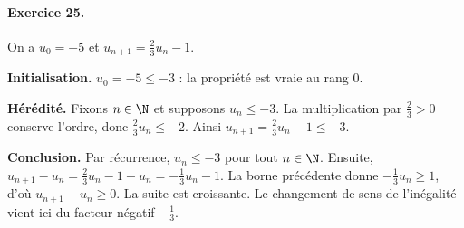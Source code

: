 \paragraph{Exercice 25.} On a $u_0=-5$ et $u_{n+1}=\frac23u_n-1$.
\par\smallskip\textbf{Initialisation.} $u_0=-5\le-3$ : la propriété est vraie au rang $0$.
\par\smallskip\textbf{Hérédité.} Fixons $n\in\N$ et supposons $u_n\le-3$. La multiplication par $\frac23>0$ conserve l'ordre, donc $\frac23u_n\le-2$. Ainsi $u_{n+1}=\frac23u_n-1\le-3$.
\par\smallskip\textbf{Conclusion.} Par récurrence, $u_n\le-3$ pour tout $n\in\N$.
Ensuite, $u_{n+1}-u_n=\frac23u_n-1-u_n=-\frac13u_n-1$. La borne précédente donne $-\frac13u_n\ge1$, d'où $u_{n+1}-u_n\ge0$. La suite est croissante. Le changement de sens de l'inégalité vient ici du facteur négatif $-\frac13$.

\fi

